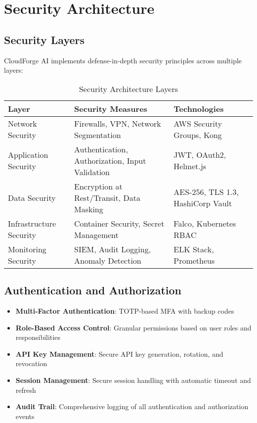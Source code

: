 \section{Security Architecture}

\subsection{Security Layers}

CloudForge AI implements defense-in-depth security principles across multiple layers:

\begin{table}[H]
\centering
\caption{Security Architecture Layers}
\begin{tabular}{|p{3cm}|p{5cm}|p{4cm}|}
\hline
\textbf{Layer} & \textbf{Security Measures} & \textbf{Technologies} \\
\hline
Network Security & Firewalls, VPN, Network Segmentation & AWS Security Groups, Kong \\
\hline
Application Security & Authentication, Authorization, Input Validation & JWT, OAuth2, Helmet.js \\
\hline
Data Security & Encryption at Rest/Transit, Data Masking & AES-256, TLS 1.3, HashiCorp Vault \\
\hline
Infrastructure Security & Container Security, Secret Management & Falco, Kubernetes RBAC \\
\hline
Monitoring Security & SIEM, Audit Logging, Anomaly Detection & ELK Stack, Prometheus \\
\hline
\end{tabular}
\end{table}

\subsection{Authentication and Authorization}

\begin{itemize}
    \item \textbf{Multi-Factor Authentication}: TOTP-based MFA with backup codes
    \item \textbf{Role-Based Access Control}: Granular permissions based on user roles and responsibilities
    \item \textbf{API Key Management}: Secure API key generation, rotation, and revocation
    \item \textbf{Session Management}: Secure session handling with automatic timeout and refresh
    \item \textbf{Audit Trail}: Comprehensive logging of all authentication and authorization events
\end{itemize}

